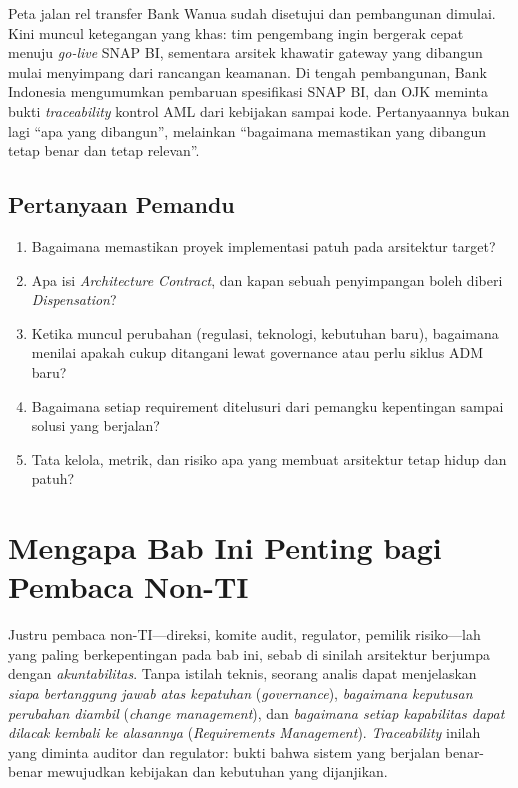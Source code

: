 Peta jalan rel transfer Bank Wanua sudah disetujui dan pembangunan dimulai. Kini
muncul ketegangan yang khas: tim pengembang ingin bergerak cepat menuju
\emph{go-live} SNAP BI, sementara arsitek khawatir gateway yang dibangun mulai
menyimpang dari rancangan keamanan. Di tengah pembangunan, Bank Indonesia
mengumumkan pembaruan spesifikasi SNAP BI, dan OJK meminta bukti \emph{traceability}
kontrol AML dari kebijakan sampai kode. Pertanyaannya bukan lagi ``apa yang
dibangun'', melainkan ``bagaimana memastikan yang dibangun tetap benar dan tetap
relevan''.

\subsection*{Pertanyaan Pemandu}
\begin{enumerate}
  \item Bagaimana memastikan proyek implementasi patuh pada arsitektur target?
  \item Apa isi \emph{Architecture Contract}, dan kapan sebuah penyimpangan boleh
        diberi \emph{Dispensation}?
  \item Ketika muncul perubahan (regulasi, teknologi, kebutuhan baru), bagaimana
        menilai apakah cukup ditangani lewat governance atau perlu siklus ADM
        baru?
  \item Bagaimana setiap requirement ditelusuri dari pemangku kepentingan sampai
        solusi yang berjalan?
  \item Tata kelola, metrik, dan risiko apa yang membuat arsitektur tetap hidup
        dan patuh?
\end{enumerate}

\section{Mengapa Bab Ini Penting bagi Pembaca Non-TI}

Justru pembaca non-TI---direksi, komite audit, regulator, pemilik risiko---lah yang
paling berkepentingan pada bab ini, sebab di sinilah arsitektur berjumpa dengan
\emph{akuntabilitas}. Tanpa istilah teknis, seorang analis dapat menjelaskan
\emph{siapa bertanggung jawab atas kepatuhan} (\emph{governance}), \emph{bagaimana
keputusan perubahan diambil} (\emph{change management}), dan \emph{bagaimana setiap
kapabilitas dapat dilacak kembali ke alasannya} (\emph{Requirements Management}).
\emph{Traceability} inilah yang diminta auditor dan regulator: bukti bahwa sistem
yang berjalan benar-benar mewujudkan kebijakan dan kebutuhan yang dijanjikan.

